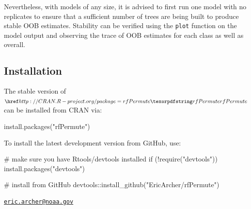 Nevertheless, with models of any size, it is advised to first run one
model with no replicates to ensure that a sufficient number of trees are
being built to produce stable OOB estimates. Stability can be verified
using the \texttt{plot} function on the model output and observing the
trace of OOB estimates for each class as well as overall.

\subsection{Installation}\label{installation}

The stable version of \(\CRANpkg{rfPermute}\) can be installed from CRAN
via:

\begin{Schunk}
\begin{Sinput}
install.packages("rfPermute")
\end{Sinput}
\end{Schunk}

To install the latest development version from GitHub, use:

\begin{Schunk}
\begin{Sinput}
# make sure you have Rtools/devtools installed
if (!require("devtools")) install.packages("devtools")

# install from GitHub
devtools::install_github("EricArcher/rfPermute")
\end{Sinput}
\end{Schunk}



\address{%
Frederick I. Archer\\
Southwest Fisheries Science Center\\
8901 La Jolla Shores Drive\\ La Jolla, CA 92037 USA\\
}
\href{mailto:eric.archer@noaa.gov}{\nolinkurl{eric.archer@noaa.gov}}

